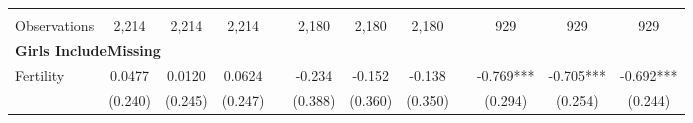 \begin{landscape}
\begin{table}[htpb!]
\begin{center}
\begin{tabular}{lcccp{2mm}cccp{2mm}ccc}
\begin{footnotesize}\end{footnotesize}&\begin{footnotesize}\end{footnotesize}&\begin{footnotesize}\end{footnotesize}&\begin{footnotesize}\end{footnotesize}&\begin{footnotesize}\end{footnotesize}&\begin{footnotesize}\end{footnotesize}&\begin{footnotesize}\end{footnotesize}&\begin{footnotesize}\end{footnotesize}&\begin{footnotesize}\end{footnotesize}&\begin{footnotesize}\end{footnotesize}&\begin{footnotesize}\end{footnotesize}&\begin{footnotesize}\end{footnotesize}\\Observations&2,214&2,214&2,214&&2,180&2,180&2,180&&929&929&929\\
\multicolumn{12}{l}{\textbf{Girls IncludeMissing}}\\ 
Fertility&0.0477&0.0120&0.0624&&-0.234&-0.152&-0.138&&-0.769***&-0.705***&-0.692***\\
&(0.240)&(0.245)&(0.247)&&(0.388)&(0.360)&(0.350)&&(0.294)&(0.254)&(0.244)\\

\end{tabular}
\end{center}
\end{table}
\end{landscape}
